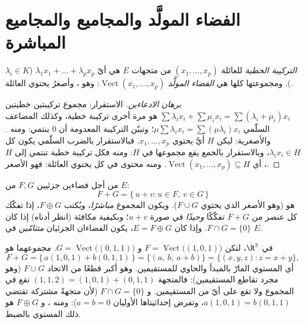 \section{الفضاء المولَّد والمجاميع والمجاميع المباشرة}

\begin{definition}\label{def:b1:vspaces:span}
\emph{التركيبة الخطية} للعائلة $(x_1, \dots, x_p)$ من
متجهات $E$ هي أيّ $\lambda_1 x_1 + \dots + \lambda_p x_p$
($\lambda_i \in K$). ومجموعتها كلها هي
\emph{الفضاء المولَّد} $\operatorname{Vect}(x_1, \dots, x_p)$: وهو
، وأصغرُ  يحتوي العائلة.
\end{definition}

\begin{proof}[برهان الادعاءين]
الاستقرار: مجموع تركيبتين خطيتين $\sum\lambda_i x_i +
\sum\mu_i x_i = \sum(\lambda_i + \mu_i)x_i$ هو مرة أخرى تركيبة خطية، وكذلك
المضاعف السلّمي $\mu\sum\lambda_i x_i = \sum(\mu\lambda_i)
x_i$؛ وتبيّن التركيبة المعدومة أن $0$ ينتمي: ومنه 
. والأصغرية: ليكن $H$ أيَّ  يحتوي $x_1,
\dots, x_p$. فبالاستقرار بالضرب السلّمي يكون كل
$\lambda_i x_i \in H$، وبالاستقرار بالجمع يقع مجموعها
في $H$: ومنه فكل تركيبة خطية تنتمي إلى $H$، أي
$\operatorname{Vect}(x_1, \dots, x_p) \subseteq H$. ومنه 
محتوى في كل  يحتوي العائلة: فهو
الأصغر.
\end{proof}

\begin{definition}\label{def:b1:vspaces:sum}
من أجل فضاءين جزئيين $F, G$ من $E$:
\[
F + G = \{\,u + v : u \in F,\ v \in G\,\}
\]
هو  (وهو الأصغر الذي يحتوي $F \cup G$). ويكون المجموع
\emph{مباشرًا}، ويُكتب $F \oplus G$، إذا تفكّك كل
عنصر من $F + G$ تفكّكًا \emph{وحيدًا} في صورة $u + v$؛
وبكيفية مكافئة (انظر أدناه) إذا كان $F \cap G = \{0\}$. وإذا كان $E = F \oplus
G$، يكون الفضاءان الجزئيان \emph{متتامّين} في $E$.
\end{definition}

\begin{example}
\label{ex:b1:vspaces:sumoflines}
في $\R^3$، لتكن $F = \operatorname{Vect}\bigl((1,0,1)\bigr)$ و
$G = \operatorname{Vect}\bigl((0,1,1)\bigr)$. مجموعهما هو
\[
F + G = \{\,a(1,0,1) + b(0,1,1)\,\}
= \{(a,\ b,\ a + b)\} = \{(x, y, z) : z = x + y\},
\]
أي المستوي المارّ بالمبدأ والحاوي للمستقيمين. وهو
أكبر قطعًا من الاتحاد $F \cup G$ (وهو مجرد تقاطع
المستقيمين): فالمتجهة $(1, 1, 2) = (1,0,1) + (0,1,1)$ تقع في
المجموع ولا تقع على أيّ من المستقيمين. و $F \cap G = \{0\}$ (لأن
متجهةً مشتركة تقتضي $a(1,0,1) = b(0,1,1)$، وتفرض إحداثيتاها
الأوليان $a = b = 0$): ومنه ، و $F \oplus
G$ هو ذلك المستوي بالضبط.
\end{example}

